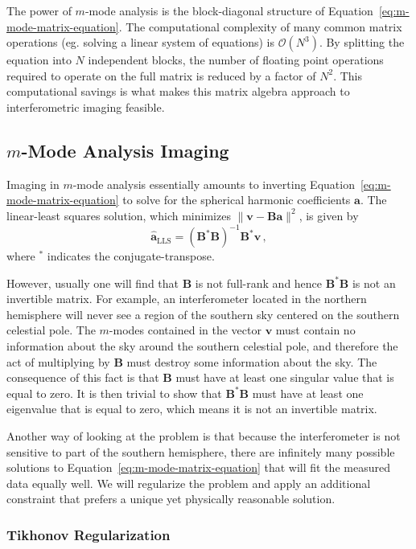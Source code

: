 \documentclass[twocolumn]{aastex61}
\renewcommand{\b}{\pmb}
\begin{document}
The power of $m$-mode analysis is the block-diagonal structure of
Equation~\ref{eq:m-mode-matrix-equation}. The computational complexity of many common matrix
operations (eg. solving a linear system of equations) is $\mathcal{O}(N^3)$.  By splitting the
equation into $N$ independent blocks, the number of floating point operations required to operate on
the full matrix is reduced by a factor of $N^2$. This computational savings is what makes this
matrix algebra approach to interferometric imaging feasible.

\subsection{$m$-Mode Analysis Imaging}\label{sec:mmode-imaging}

Imaging in $m$-mode analysis essentially amounts to inverting
Equation~\ref{eq:m-mode-matrix-equation} to solve for the spherical harmonic coefficients $\b a$.
The linear-least squares solution, which minimizes $\|\b v - \b B\b a\|^2$, is given by
\begin{equation}
    \b{\hat a}_\text{LLS} = (\b B^*\b B)^{-1}\b B^*\b v\,,
\end{equation}
where $^*$ indicates the conjugate-transpose.

However, usually one will find that $\b B$ is not full-rank and hence $\b B^*\b B$ is not an
invertible matrix. For example, an interferometer located in the northern hemisphere will never see
a region of the southern sky centered on the southern celestial pole. The $m$-modes contained in the
vector $\b v$ must contain no information about the sky around the southern celestial pole, and
therefore the act of multiplying by $\b B$ must destroy some information about the sky. The
consequence of this fact is that $\b B$ must have at least one singular value that is equal to zero.
It is then trivial to show that $\b B^*\b B$ must have at least one eigenvalue that is equal to
zero, which means it is not an invertible matrix.

Another way of looking at the problem is that because the interferometer is not sensitive to part of
the southern hemisphere, there are infinitely many possible solutions to
Equation~\ref{eq:m-mode-matrix-equation} that will fit the measured data equally well.  We will
regularize the problem and apply an additional constraint that prefers a unique yet physically
reasonable solution.

\subsubsection{Tikhonov Regularization}
\end{document}
